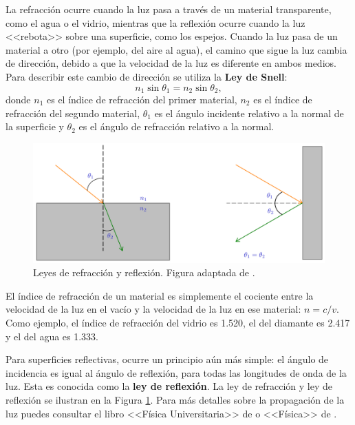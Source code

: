 La refracción ocurre cuando la luz pasa a través de un material transparente, como el agua o el vidrio, mientras que la reflexión ocurre cuando la luz <<rebota>> sobre una superficie, como los espejos. Cuando la luz pasa de un material a otro (por ejemplo, del aire al agua), el camino que sigue la luz cambia de dirección, debido a que la velocidad de la luz es diferente en ambos medios. Para describir este cambio de dirección se utiliza la \textbf{Ley de Snell}:
\[ n_1 \sin\theta_1 = n_2 \sin \theta_2, \]
donde $ n_1 $ es el índice de refracción del primer material, $ n_2 $ es el índice de refracción del segundo material, $ \theta_1 $ es el ángulo incidente relativo a la normal de la superficie y $ \theta_2 $ es el ángulo de refracción relativo a la normal.

\begin{figure}[htb]
  \centering
  \includegraphics[width=\textwidth]{figures/light_laws.png}
  \caption{Leyes de refracción y reflexión. Figura adaptada de \citet{birney2006observational}.}
  \label{fig:light_laws}
  \end{figure} 

El índice de refracción de un material es simplemente el cociente entre la velocidad de la luz en el vacío y la velocidad de la luz en ese material: $ n = c/v $. Como ejemplo, el índice de refracción del vidrio es 1.520, el del diamante es 2.417 y el del agua es 1.333.

Para superficies reflectivas, ocurre un principio aún más simple: el ángulo de incidencia es igual al ángulo de reflexión, para todas las longitudes de onda de la luz. Esta es conocida como la \textbf{ley de reflexión}. La ley de refracción y ley de reflexión se ilustran en la Figura \ref{fig:light_laws}. Para más detalles sobre la propagación de la luz puedes consultar el libro <<Física Universitaria>> de \citet{young2020university} o <<Física>> de \citet{halliday2010physics}. 

